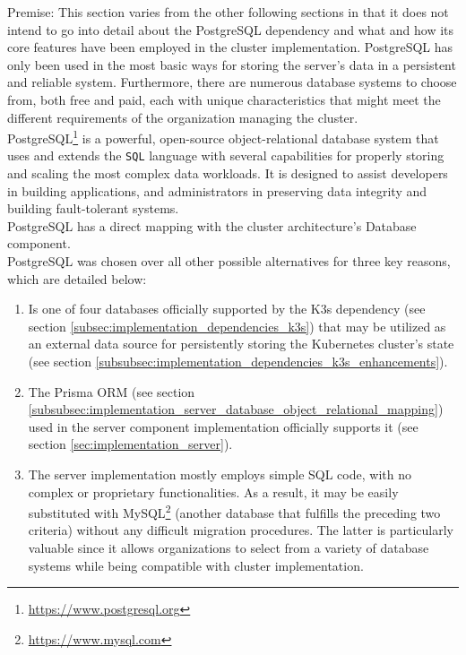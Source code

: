 Premise: This section varies from the other following sections in that it does not
intend to go into detail about the PostgreSQL dependency and what and how its core
features have been employed in the cluster implementation. PostgreSQL has only
been used in the most basic ways for storing the server's data in a persistent
and reliable system. Furthermore, there are numerous database systems to choose
from, both free and paid, each with unique characteristics that might meet the
different requirements of the organization managing the cluster. \\ %
PostgreSQL\footnote{\url{https://www.postgresql.org}} is a powerful, open-source
object-relational database system that uses and extends the \texttt{SQL}
language with several capabilities for properly storing and scaling the most
complex data workloads. It is designed to assist developers in building applications,
and administrators in preserving data integrity and building fault-tolerant
systems. \\ %
PostgreSQL has a direct mapping with the cluster architecture's Database
component. \\ %
PostgreSQL was chosen over all other possible alternatives for three key reasons,
which are detailed below:
\begin{enumerate}
  \item Is one of four databases officially supported by the K3s dependency (see
    section \ref{subsec:implementation_dependencies_k3s}) that may be utilized as
    an external data source for persistently storing the Kubernetes cluster's state
    (see section \ref{subsubsec:implementation_dependencies_k3s_enhancements}).

  \item The Prisma ORM (see section
    \ref{subsubsec:implementation_server_database_object_relational_mapping}) used
    in the server component implementation officially supports it (see section
    \ref{sec:implementation_server}).

  \item The server implementation mostly employs simple SQL code, with no
    complex or proprietary functionalities. As a result, it may be easily
    substituted with MySQL\footnote{\url{https://www.mysql.com}} (another database
    that fulfills the preceding two criteria) without any difficult migration
    procedures. The latter is particularly valuable since it allows organizations
    to select from a variety of database systems while being compatible with cluster
    implementation.
\end{enumerate}

